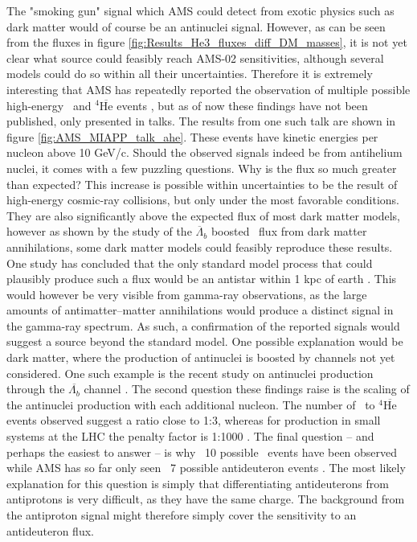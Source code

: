 The "smoking gun" signal which AMS could detect from exotic physics such as dark matter would of course be an antinuclei signal. However, as can be seen from the fluxes in figure \ref{fig:Results_He3_fluxes_diff_DM_masses}, it is not yet clear what source could feasibly reach AMS-02 sensitivities, although several models could do so within all their uncertainties. Therefore it is extremely interesting that AMS has repeatedly reported the observation of multiple possible high-energy \ahe\ and $^4\mathrm{\overline{He}}$ events \cite{AMS_ahe_report, AMS_ahe_tease}, but as of now these findings have not been published, only presented in talks. The results from one such talk are shown in figure \ref{fig:AMS_MIAPP_talk_ahe}. These events have kinetic energies per nucleon above 10 GeV/c. Should the observed signals indeed be from antihelium nuclei, it comes with a few puzzling questions. Why is the flux so much greater than expected? This increase is possible within uncertainties to be the result of high-energy cosmic-ray collisions, but only under the most favorable conditions. They are also significantly above the expected flux of most dark matter models, however as shown by the study of the $\overline{\Lambda}_b$ boosted \ahe\ flux from dark matter annihilations, some dark matter models could feasibly reproduce these results. One study has concluded that the only standard model process that could plausibly produce such a flux would be an antistar within 1 kpc of earth \cite{Poulin_AMS_ahe_events, Coogan_2017}. This would however be very visible from gamma-ray observations, as the large amounts of antimatter--matter annihilations would produce a distinct signal in the gamma-ray spectrum. As such, a confirmation of the reported signals would suggest a source beyond the standard model. One possible explanation would be dark matter, where the production of antinuclei is boosted by channels not yet considered. One such example is the recent study on antinuclei production through the $\overline{\Lambda_b}$ channel \cite{Winkler_2021}. The second question these findings raise is the scaling of the antinuclei production with each additional nucleon. The number of \ahe\ to $^4\mathrm{\overline{He}}$ events observed suggest a ratio close to 1:3, whereas for production in small systems at the LHC the penalty factor is 1:1000 \cite{antinuclei_mult_dependence}. The final question -- and perhaps the easiest to answer -- is why ~10 possible \ahe\ events have been observed while AMS has so far only seen ~7 possible antideuteron events \cite{MIAPP_AMS_talk}. The most likely explanation for this question is simply that differentiating antideuterons from antiprotons is very difficult, as they have the same charge. The background from the antiproton signal might therefore simply cover the sensitivity to an antideuteron flux.\\
